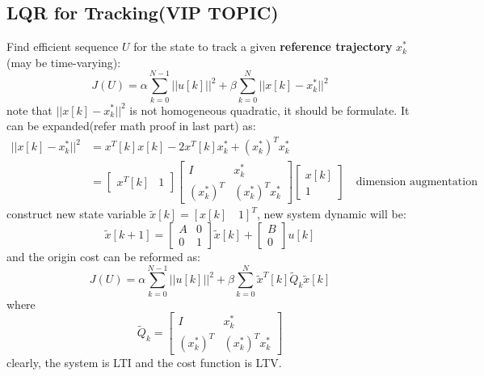 \documentclass[10pt,a4paper,oneside]{article}
\begin{document}
\subsection{LQR for Tracking(VIP TOPIC)}
Find efficient sequence $U$ for the state to track a given\textbf{ reference trajectory} $x_k^*$(may be time-varying):
\[
J(U) = \alpha \sum_{k=0}^{N-1} ||u[k]||^2 + \beta \sum_{k=0}^{N} ||x[k] - x_k^*||^2
\]
note that $||x[k] - x_k^*||^2$ is not homogeneous quadratic, it should be formulate. It can be expanded(refer math proof in last part) as:
\begin{align*}
||x[k] - x_k^*||^2 &= x^T[k] x[k] -2x^T[k]x_k^* + (x_k^*)^T x_k^*\\
&=\begin{bmatrix}
x^T[k] & 1
\end{bmatrix}
\begin{bmatrix}
I & x_k^*\\
(x_k^*)^T &  (x_k^*)^T x_k^*
\end{bmatrix}
\begin{bmatrix}
x[k]\\ 1
\end{bmatrix} \quad \text{dimension augmentation}
\end{align*}
construct new state variable $\tilde{x}[k] = [x[k]\quad 1]^T$, new system dynamic will be:
\[
\tilde{x}[k+1] = \begin{bmatrix}
A & 0 \\ 0& 1
\end{bmatrix} \tilde{x}[k] + \begin{bmatrix}
B \\ 0
\end{bmatrix} u[k]
\]
and the origin cost can be reformed as:
\[
J(U) = \alpha \sum_{k=0}^{N-1} ||u[k]||^2 + \beta \sum_{k=0}^{N} \tilde{x}^T[k] \tilde{Q}_k \tilde{x}[k] 
\]
where
\[
\tilde{Q}_k = \begin{bmatrix}
I & x_k^*\\
(x_k^*)^T &  (x_k^*)^T x_k^*
\end{bmatrix}
\]
clearly, the system is LTI and the cost function is LTV.
\end{document}

